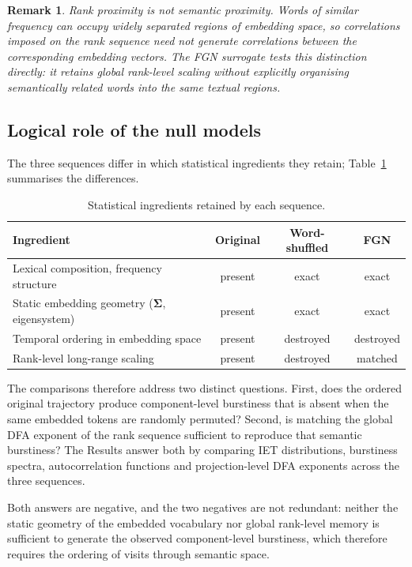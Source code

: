 \documentclass[12pt,a4paper]{article}
\newtheorem{remark}{Remark}
\newcommand{\Sig}{\boldsymbol{\Sigma}}
\begin{document}
\begin{remark}
\label{rem:fgn_entropy}
  Rank proximity is not semantic proximity.
  Words of similar frequency can occupy widely separated regions of
  embedding space, so correlations imposed on the rank sequence need
  not generate correlations between the corresponding embedding
  vectors.
  The FGN surrogate tests this distinction directly: it retains global
  rank-level scaling without explicitly organising semantically related
  words into the same textual regions.
\end{remark}

\subsection{Logical role of the null models}
\label{sec:taxonomy}

The three sequences differ in which statistical ingredients they retain;
Table~\ref{tab:null_taxonomy} summarises the differences.

\begin{table}[htbp]
\centering
\caption{Statistical ingredients retained by each sequence.}

\label{tab:null_taxonomy}
\small
\begin{tabular}{lccc}
\toprule
Ingredient & Original & Word-shuffled & FGN \\
\midrule
Lexical composition, frequency structure & present & exact & exact \\
Static embedding geometry ($\Sig$, eigensystem) & present & exact & exact \\
Temporal ordering in embedding space & present & destroyed & destroyed \\
Rank-level long-range scaling & present & destroyed & matched \\
\bottomrule
\end{tabular}
\end{table}

The comparisons therefore address two distinct questions.
First, does the ordered original trajectory produce component-level
burstiness that is absent when the same embedded tokens are randomly
permuted?
Second, is matching the global DFA exponent of the rank sequence
sufficient to reproduce that semantic burstiness?
The Results answer both by comparing IET distributions, burstiness
spectra, autocorrelation functions and projection-level DFA exponents
across the three sequences.

Both answers are negative, and the two negatives are not redundant:
neither the static geometry of the embedded vocabulary nor global
rank-level memory is sufficient to generate the observed
component-level burstiness, which therefore requires the ordering of
visits through semantic space.
\end{document}
